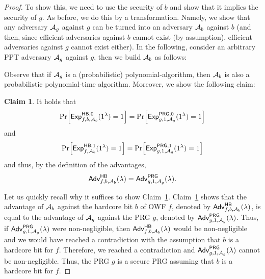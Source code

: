 \documentclass[a4paper,table,dvipsnames]{article}
\theoremstyle{definition}
\newtheorem{claim}{Claim}
\begin{document}
\begin{proof}
To show this, we need to use the security of $b$ and show that it implies the security of $g$.
As before, we do this by a transformation. Namely, we show that any adversary $\mathcal{A}_g$ against $g$ can
be turned into an adversary $\mathcal{A}_b$ against $b$ (and then, since efficient adversaries against $b$ cannot
 exist (by assumption), efficient adversaries against $g$ cannot exist either). In the following, consider
an arbitrary PPT adversary $\mathcal{A}_g$ against $g$, then we build $\mathcal{A}_b$ as follows:
\begin{center}
				\begin{pchstack}
				\end{pchstack}
			\end{center}
Observe that if $\mathcal{A}_g$ is a (probabilistic) polynomial-algorithm, then $\mathcal{A}_b$ is also a probabilistic
polynomial-time algorithm. Moreover, we show the following claim:
\begin{claim}\label{claim:hbprg}
It holds that
\begin{equation}\label{eqn:lalaland}
\prob{{\mathsf{Exp}}_{f,b,\adv_b}^{\mathsf{HB},0}(1^\lambda) = 1} = \prob{{\mathsf{Exp}}_{g,1,\adv_g}^{\mathsf{PRG},0}(1^\lambda) = 1}
\end{equation}
and
\begin{equation}\label{eqn:lalaland1}
\prob{{\mathsf{Exp}}_{f,\adv_b}^{\mathsf{HB},1}(1^\lambda) = 1} = \prob{{\mathsf{Exp}}_{g,1,\adv_g}^{\mathsf{PRG},1}(1^\lambda) = 1}
\end{equation}
and thus, by the definition of the advantages,
\[\mathsf{Adv}^{\mathsf{HB}}_{f,b,\mathcal{A}_b}(\lambda)=
\mathsf{Adv}^{\mathsf{PRG}}_{g,1,\mathcal{A}_g}(\lambda).\]
\end{claim}
Let us quickly recall why it suffices to show Claim~\ref{claim:hbprg}. Claim~\ref{claim:hbprg} shows that
the advantage of $\mathcal{A}_b$ against the hardcore bit $b$ of OWF $f$, denoted by $\mathsf{Adv}^{\mathsf{HB}}_{f,b,\mathcal{A}_b}(\lambda)$,
is equal to the advantage of $\mathcal{A}_g$ against the PRG $g$, denoted by $\mathsf{Adv}^{\mathsf{PRG}}_{g,1,\mathcal{A}_g}(\lambda)$.
Thus, if $\mathsf{Adv}^{\mathsf{PRG}}_{g,1,\mathcal{A}_g}(\lambda)$ were non-negligible, then $\mathsf{Adv}^{\mathsf{HB}}_{f,b,\mathcal{A}_b}(\lambda)$ would be non-negligible and we would have reached a contradiction with the assumption that $b$ is a hardcore bit for $f$. Therefore,
we reached a contradiction and $\mathsf{Adv}^{\mathsf{PRG}}_{g,1,\mathcal{A}_g}(\lambda)$ cannot be non-negligible. Thus, the PRG $g$ is a secure PRG assuming that $b$ is a hardcore bit for $f$.


\end{proof}
\end{document}
